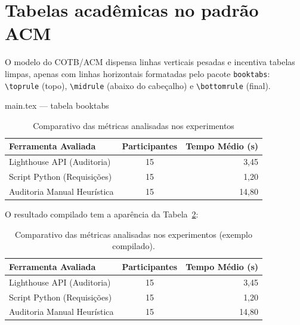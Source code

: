     \section{Tabelas acadêmicas no padrão ACM}\label{sec:tabelas}

    O modelo do COTB/ACM dispensa linhas verticais pesadas e incentiva tabelas limpas, apenas com linhas horizontais formatadas pelo pacote \texttt{booktabs}: \texttt{\textbackslash toprule} (topo), \texttt{\textbackslash midrule} (abaixo do cabeçalho) e \texttt{\textbackslash bottomrule} (final).

    \begin{codigo}[tex]{main.tex --- tabela booktabs}
        \begin{table}[htbp]
            \caption{Comparativo das métricas analisadas nos experimentos}
            \label{tab:metricas}
            \centering
            \begin{tabular}{lcr}
                \toprule
                \textbf{Ferramenta Avaliada} & \textbf{Participantes} & \textbf{Tempo Médio (s)} \\
                \midrule
                Lighthouse API (Auditoria)   & 15 & 3,45 \\
                Script Python (Requisições)  & 15 & 1,20 \\
                Auditoria Manual Heurística  & 15 & 14,80 \\
                \bottomrule
            \end{tabular}
        \end{table}
    \end{codigo}

    O resultado compilado tem a aparência da Tabela~\ref{tab:resultadoBooktabs}:

    \begin{table}[H]
        \centering
        \caption{Comparativo das métricas analisadas nos experimentos (exemplo compilado).}\label{tab:resultadoBooktabs}
        \begin{tcolorbox}[enhanced, colback=white, colframe=borda, boxrule=0.6pt, arc=8pt, width=0.78\linewidth, halign=center, top=8pt, bottom=8pt]
            \small{}
            \begin{tabular}{lcr}
                \toprule
                \textbf{Ferramenta Avaliada} & \textbf{Participantes} & \textbf{Tempo Médio (s)} \\
                \midrule
                Lighthouse API (Auditoria) & 15 & 3,45 \\
                Script Python (Requisições) & 15 & 1,20 \\
                Auditoria Manual Heurística & 15 & 14,80 \\
                \bottomrule
            \end{tabular}
        \end{tcolorbox}
    \end{table}

